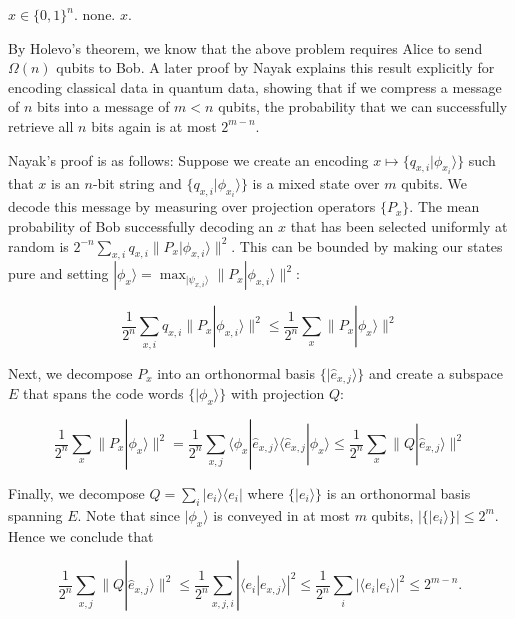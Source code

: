 \documentclass[a4paper]{article}
\begin{document}
        \begin{codebox}
            \zi {} $x \in \{0, 1\}^n$.
            \zi {} none.
            \zi {} $x$.
        \end{codebox}

        By Holevo's theorem, we know that the above problem requires Alice to send $\Omega(n)$ qubits to Bob. A later proof by Nayak \cite{814608} explains this result explicitly for encoding classical data in quantum data, showing that if we compress a message of $n$ bits into a message of $m < n$ qubits, the probability that we can successfully retrieve all $n$ bits again is at most $2^{m-n}$.

        Nayak's proof is as follows: Suppose we create an encoding $x \mapsto \{q_{x,i}|\phi_{x_i}\rangle\}$ such that $x$ is an $n$-bit string and $\{q_{x,i}|\phi_{x_i}\rangle\}$ is a mixed state over $m$ qubits. We decode this message by measuring over projection operators $\{P_x\}$. The mean probability of Bob successfully decoding an $x$ that has been selected uniformly at random is $2^{-n}\sum_{x, i}q_{x, i}\|P_x|\phi_{x,i}\rangle\|^2$. This can be bounded by making our states pure and setting $|\phi_x\rangle = \max_{|\psi_{x, i}\rangle}\|P_x|\phi_{x, i}\rangle\|^2$:

        $$\frac{1}{2^n}\sum_{x, i}q_{x, i}\|P_x|\phi_{x,i}\rangle\|^2 \leq \frac{1}{2^n}\sum_{x}\|P_x|\phi_{x}\rangle\|^2$$

        Next, we decompose $P_x$ into an orthonormal basis $\{|\hat{e}_{x, j}\rangle\}$ and create a subspace $E$ that spans the code words $\{|\phi_x\rangle\}$ with projection $Q$:

        $$\frac{1}{2^n}\sum_{x}\|P_x|\phi_{x}\rangle\|^2 = \frac{1}{2^n}\sum_{x, j}\langle\phi_x|\hat{e}_{x, j}\rangle\langle\hat{e}_{x, j}|\phi_x\rangle \leq \frac{1}{2^n}\sum_{x}\|Q|\hat{e}_{x, j}\rangle\|^2$$

        Finally, we decompose $Q = \sum_i|e_i\rangle\langle e_i|$ where $\{|e_i\rangle\}$ is an orthonormal basis spanning $E$. Note that since $|\phi_x\rangle$ is conveyed in at most $m$ qubits, $|\{|e_i\rangle\}| \leq 2^m$. Hence we conclude that

        $$\frac{1}{2^n}\sum_{x, j}\|Q|\hat{e}_{x, j}\rangle\|^2 \leq \frac{1}{2^n}\sum_{x, j, i}|\langle e_i|e_{x, j}\rangle|^2 \leq \frac{1}{2^n}\sum_{i}|\langle e_i|e_i\rangle|^2 \leq 2^{m - n}.$$
\end{document}
